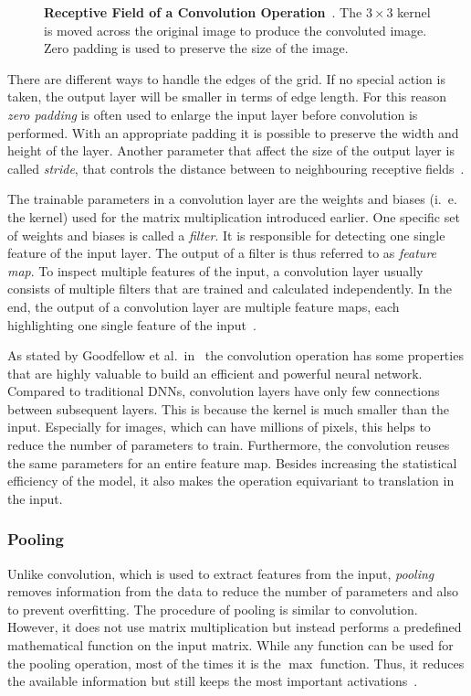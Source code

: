\begin{figure}[h]
    \centering
    
    \caption[Receptive Field of a Convolution Operation]
    {\textbf{Receptive Field of a Convolution Operation}~\cite[modified]{conv_arithmetic18}. The $3\times 3$ kernel is moved across the original image to produce the convoluted image. Zero padding is used to preserve the size of the image.}
    \label{fig:convolution}
\end{figure}

There are different ways to handle the edges of the grid. If no special action is taken, the output layer will be smaller in terms of edge length. For this reason \emph{zero padding} is often used to enlarge the input layer before convolution is performed. With an appropriate padding it is possible to preserve the width and height of the layer. Another parameter that affect the size of the output layer is called \emph{stride}, that controls the distance between to neighbouring receptive fields~\cite[p.~361]{praxiseinstieg_ml17}.

The trainable parameters in a convolution layer are the weights and biases (i.~e. the kernel) used for the matrix multiplication introduced earlier. One specific set of weights and biases is called a \emph{filter}. It is responsible for detecting one single feature of the input layer. The output of a filter is thus referred to as \emph{feature map}. To inspect multiple features of the input, a convolution layer usually consists of multiple filters that are trained and calculated independently. In the end, the output of a convolution layer are multiple feature maps, each highlighting one single feature of the input~\cite[p.~363 f]{praxiseinstieg_ml17}.

As stated by Goodfellow et al.\ in~\cite{DLbook16} the convolution operation has some properties that are highly valuable to build an efficient and powerful neural network. Compared to traditional DNNs, convolution layers have only few connections between subsequent layers. This is because the kernel is much smaller than the input. Especially for images, which can have millions of pixels, this helps to reduce the number of parameters to train. Furthermore, the convolution reuses the same parameters for an entire feature map. Besides increasing the statistical efficiency of the model, it also makes the operation equivariant to translation in the input.

\subsubsection{Pooling}
\label{sec:pooling}
Unlike convolution, which is used to extract features from the input, \emph{pooling} removes information from the data to reduce the number of parameters and also to prevent overfitting. The procedure of pooling is similar to convolution. However, it does not use matrix multiplication but instead performs a predefined mathematical function on the input matrix. While any function can be used for the pooling operation, most of the times it is the $\max$ function. Thus, it reduces the available information but still keeps the most important activations~\cite[p.~369 f]{praxiseinstieg_ml17}.

